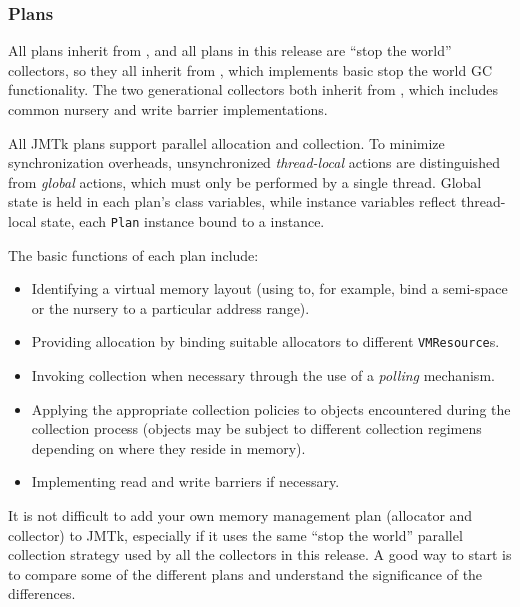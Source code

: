 \subsubsection{Plans} \label{sssec:plans}

All plans inherit from ,
and all plans in this release are ``stop the world'' collectors, so
they all inherit from
, which implements
basic stop the world GC functionality.  The two generational
collectors both inherit from
, which includes
common nursery and write barrier implementations.

All JMTk plans support parallel allocation and collection.  To
minimize synchronization overheads, unsynchronized \emph{thread-local}
actions are distinguished from \emph{global} actions, which must only
be performed by a single thread.  Global state is held in each plan's
class variables, while instance variables reflect thread-local state,
each \texttt{Plan} instance bound to a
 instance.

The basic functions of each plan include:
\begin{itemize}
\item Identifying a virtual memory layout (using
   to, for example, bind
  a semi-space or the nursery to a particular address range).
\item Providing allocation by binding suitable allocators to different
  \texttt{VMResource}s.
\item Invoking collection when necessary through the use of a
  \emph{polling} mechanism.
\item Applying the appropriate collection policies to objects
  encountered during the collection process (objects may be subject to
  different collection regimens depending on where they reside in
  memory).
\item Implementing read and write barriers if necessary.
\end{itemize}

It is not difficult to add your own memory management plan (allocator
and collector) to JMTk, especially if it uses the same ``stop the
world'' parallel collection strategy used by all the collectors in
this release.  A good way to start is to compare some of the different
plans and understand the significance of the differences.

